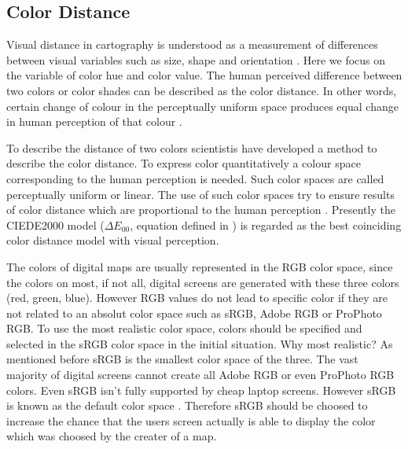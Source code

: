 \subsection{Color Distance}\label{subsection:distance}
Visual distance in cartography is understood as a measurement of differences between visual variables such as size, shape and orientation \parencite{brychtova2015}. Here we focus on the variable of color hue and color value. The human perceived difference between two colors or color shades can be described as the color distance. In other words, certain change of colour in the perceptually uniform space produces equal change in human perception of that colour \parencite{brychtovaC2017}.

To describe the distance of two colors scientistis have developed a method to describe the color distance. To express color quantitatively a colour space corresponding to the human perception is needed. Such color spaces are called perceptually uniform or linear. The use of such color spaces try to ensure results of color distance which are proportional to the human perception \parencite{brychtova2015}. Presently the CIEDE2000 model ($\Delta E_{00}$, equation defined in \textcite{brychtova2015}) is regarded as the best coinciding color distance model with visual perception. 
 
The colors of digital maps are usually represented in the RGB color space, since the colors on most, if not all, digital screens are generated with these three colors (red, green, blue). However RGB values do not lead to specific color if they are not related to an absolut color space such as sRGB, Adobe RGB or ProPhoto RGB. To use the most realistic color space, colors should be specified and selected in the sRGB color space in the initial situation. Why most realistic? As mentioned before sRGB is the smallest color space of the three. The vast majority of digital screens cannot create all Adobe RGB or even ProPhoto RGB colors. Even sRGB isn't fully supported by cheap laptop screens. However sRGB is known as the default color space \parencite{kenrockwell2006}. Therefore sRGB should be choosed to increase the chance that the users screen actually is able to display the color which was choosed by the creater of a map. 

